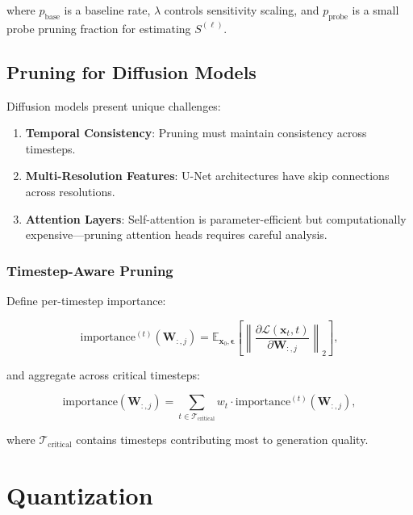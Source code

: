 \documentclass[12pt]{report}
\theoremstyle{definition}
\newcommand{\E}{\mathbb{E}}
\newcommand{\loss}{\mathcal{L}}
\begin{document}
where $p_{\text{base}}$ is a baseline rate, $\lambda$ controls sensitivity scaling, and $p_{\text{probe}}$ is a small probe pruning fraction for estimating $S^{(\ell)}$.

\subsection{Pruning for Diffusion Models}

Diffusion models present unique challenges:

\begin{enumerate}
\item \textbf{Temporal Consistency}: Pruning must maintain consistency across timesteps.
\item \textbf{Multi-Resolution Features}: U-Net architectures have skip connections across resolutions.
\item \textbf{Attention Layers}: Self-attention is parameter-efficient but computationally expensive—pruning attention heads requires careful analysis.
\end{enumerate}

\subsubsection{Timestep-Aware Pruning}

Define per-timestep importance:

\begin{equation}
\text{importance}^{(t)}(\mathbf{W}_{:,j}) = \E_{\mathbf{x}_0, \boldsymbol{\epsilon}}\left[\left\|\frac{\partial \loss(\mathbf{x}_t, t)}{\partial \mathbf{W}_{:,j}}\right\|_2\right],
\label{eq:timestep_importance}
\end{equation}

and aggregate across critical timesteps:

\begin{equation}
\text{importance}(\mathbf{W}_{:,j}) = \sum_{t \in \mathcal{T}_{\text{critical}}} w_t \cdot \text{importance}^{(t)}(\mathbf{W}_{:,j}),
\label{eq:importance_aggregated}
\end{equation}

where $\mathcal{T}_{\text{critical}}$ contains timesteps contributing most to generation quality.

\section{Quantization}
\end{document}
